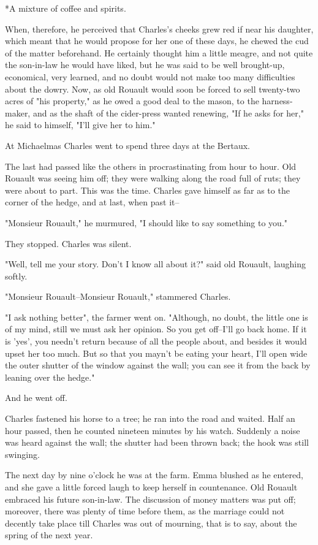 \documentclass{tufte-book}
\begin{document}
     *A mixture of coffee and spirits.

When, therefore, he perceived that Charles's cheeks grew red if near his
daughter, which meant that he would propose for her one of these days,
he chewed the cud of the matter beforehand. He certainly thought him a
little meagre, and not quite the son-in-law he would have liked, but he
was said to be well brought-up, economical, very learned, and no doubt
would not make too many difficulties about the dowry. Now, as old
Rouault would soon be forced to sell twenty-two acres of "his property,"
as he owed a good deal to the mason, to the harness-maker, and as the
shaft of the cider-press wanted renewing, "If he asks for her," he said
to himself, "I'll give her to him."

At Michaelmas Charles went to spend three days at the Bertaux.

The last had passed like the others in procrastinating from hour to
hour. Old Rouault was seeing him off; they were walking along the road
full of ruts; they were about to part. This was the time. Charles gave
himself as far as to the corner of the hedge, and at last, when past
it--

"Monsieur Rouault," he murmured, "I should like to say something to
you."

They stopped. Charles was silent.

"Well, tell me your story. Don't I know all about it?" said old Rouault,
laughing softly.

"Monsieur Rouault--Monsieur Rouault," stammered Charles.

"I ask nothing better", the farmer went on. "Although, no doubt, the
little one is of my mind, still we must ask her opinion. So you get
off--I'll go back home. If it is 'yes', you needn't return because of
all the people about, and besides it would upset her too much. But so
that you mayn't be eating your heart, I'll open wide the outer shutter
of the window against the wall; you can see it from the back by leaning
over the hedge."

And he went off.

Charles fastened his horse to a tree; he ran into the road and waited.
Half an hour passed, then he counted nineteen minutes by his watch.
Suddenly a noise was heard against the wall; the shutter had been thrown
back; the hook was still swinging.

The next day by nine o'clock he was at the farm. Emma blushed as
he entered, and she gave a little forced laugh to keep herself in
countenance. Old Rouault embraced his future son-in-law. The discussion
of money matters was put off; moreover, there was plenty of time before
them, as the marriage could not decently take place till Charles was out
of mourning, that is to say, about the spring of the next year.
\end{document}
